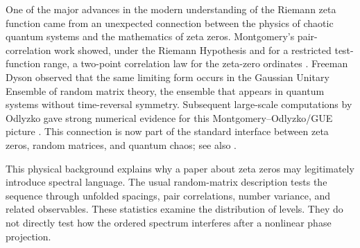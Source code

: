 \documentclass[11pt]{amsart}
\numberwithin{equation}{section}
\theoremstyle{plain}
\theoremstyle{definition}
\theoremstyle{remark}
\begin{document}
One of the major advances in the modern understanding of the Riemann zeta function came from an unexpected connection between the physics of chaotic quantum systems and the mathematics of zeta zeros.  Montgomery's pair-correlation work showed, under the Riemann Hypothesis and for a restricted test-function range, a two-point correlation law for the zeta-zero ordinates \cite{Montgomery1973}.  Freeman Dyson observed that the same limiting form occurs in the Gaussian Unitary Ensemble of random matrix theory, the ensemble that appears in quantum systems without time-reversal symmetry.  Subsequent large-scale computations by Odlyzko gave strong numerical evidence for this Montgomery--Odlyzko/GUE picture \cite{Odlyzko1987}.  This connection is now part of the standard interface between zeta zeros, random matrices, and quantum chaos; see also \cite{Berry1986,BohigasGiannoniSchmit1984,KatzSarnak1999,RudnickSarnak1996,KeatingSnaith2000,ConreySnaith2008}.

This physical background explains why a paper about zeta zeros may legitimately introduce spectral language.  The usual random-matrix description tests the sequence through unfolded spacings, pair correlations, number variance, and related observables.  These statistics examine the distribution of levels.  They do not directly test how the ordered spectrum interferes after a nonlinear phase projection.
\end{document}
